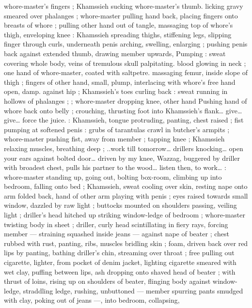 whore-master's fingers ; Khamssieh sucking whore-master's thumb. 
licking gravy smeared over phalanges ; whore-master pulling hand 
back, placing fingers onto breasts of whore ; pulling other hand out 
of tangle, massaging top of whore's thigh, enveloping knee : 
Khamssieh spreading thighs, stiffening legs, slipping finger through 
curls, underneath penis arching, swelling, enlarging ; pushing penis 
back against extended thumb, drawing member upwards, Pumping : 
sweat covering whole body, veins of tremulous skull palpitating. 
blood glowing in neck ; one hand of whore-master, coated with 
saltpetre. massaging femur, inside slope of thigh ; fingers of other 
hand, small, plump, interlacing with whore's free hand open, damp. 
against hip ; Khamssieh's toes curling back : sweat running in 
hollows of phalanges ; ; whore-master dropping knee, other hand 
Pushing hand of whore back onto belly ; crouching, thrusting foot 
into Khamssieh's flank{\ldots} {\gl} give{\ldots} give{\ldots} force the juice. {\gr} : 
Khamssieh, tongue protruding, panting, chest raised ; fist pumping 
at softened penis{\td} : {\gl}{\td} grubs of tarantulas crawl in butcher's 
armpits{\td} {\gr} ; whore-master pushing fist, away from member ; tapping 
knee ; Khamssieh relaxing muscles, breathing deep ; {\gl}..work till 
tomorrow{\ldots} drillers knocking{\ldots} open your ears against bolted door{\ldots} 
driven by my knee, Wazzag, buggered by driller with broadest chest, 
pulls his partner to the wood{\ldots} listen then, to work{\ldots}{\gr} : whore-master 
standing up, going out, bolting box-room, climbing up into bedroom, 
falling onto bed ; Khamssieh, sweat cooling over skin, resting nape 
onto arm folded back, hand of other arm playing with penis ; eyes 
raised towards small window, dazzled by raw light ; buttocks mounted 
on shoulders passing, veiling light ; driller's head hitched up striking 
window-ledge of bedroom ; whore-master twisting body in sheet ; 
driller, curly head scintillating in fiery rays, forcing member --- 
straining squashed inside jeans --- against nape of beater ; chest 
rubbed with rust, panting, ribs, muscles bridling skin ; foam, driven 
back over red lips by panting, bathing driller's chin, streaming over 
throat ; free pulling out cigarette, lighter, from pocket of denim 
jacket, lighting cigarette smeared with wet clay, puffing between lips, 
ash dropping onto shaved head of beater ; with thrust of loins, rising 
up on shoulders of beater, flinging body against window-ledge, 
straddling ledge, rushing, unbuttoned --- member spurring pants 
smudged with clay, poking out of jeans ---, into bedroom, collapsing, 
